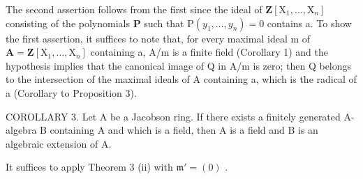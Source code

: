 The second assertion follows from the first since the ideal of \(\mathbf{Z}[\mathrm{X}_1,\ldots ,\mathrm{X}_n]\) consisting of the polynomials \(\mathbf{P}\) such that \(\mathrm{P}(y_1,\dots,y_n) = 0\) contains a. To show the first assertion, it suffices to note that, for every maximal ideal m of \(\mathbf{A} = \mathbf{Z}[\mathrm{X}_1,\dots,\mathrm{X}_n]\) containing a, A/m is a finite field (Corollary 1) and the hypothesis implies that the canonical image of Q in A/m is zero; then Q belongs to the intersection of the maximal ideals of A containing a, which is the radical of a (Corollary to Proposition 3).

COROLLARY 3. Let A be a Jacobson ring. If there exists a finitely generated A-algebra B containing A and which is a field, then A is a field and B is an algebraic extension of A.

It suffices to apply Theorem 3 (ii) with \(\mathfrak{m}' = (0)\) .


